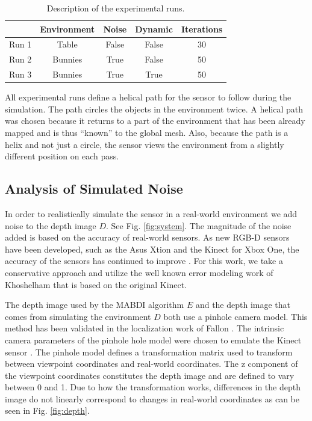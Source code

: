 \begin{table}[h]
  \caption{Description of the experimental runs.}
  \label{tab:run}
  \begin{footnotesize}
  \begin{center}
    \begin{tabular}{|l|c|c|c|c|}
    \hline
           & Environment & Noise   & Dynamic & Iterations \\\hline
    Run 1	 & Table       & False   & False   & 30 \\
    Run 2  & Bunnies     & True    & False   & 50 \\
    Run 3  & Bunnies     & True    & True    & 50 \\
    \hline
    \end{tabular}
  \end{center}
  \end{footnotesize}
\end{table}

All experimental runs define a helical path for the sensor to follow during the
simulation. The path circles the objects in the environment twice. A helical
path was chosen because it returns to a part of the environment that has been
already mapped and is thus ``known'' to the global mesh. Also, because the path
is a helix and not just a circle, the sensor views the environment from a
slightly different position on each pass.

\subsection{Analysis of Simulated Noise}

In order to realistically simulate the sensor in a real-world environment we add
noise to the depth image $D$. See Fig. \ref{fig:system}. The magnitude of the
noise added is based on the accuracy of real-world sensors. As new RGB-D sensors
have been developed, such as the Asus Xtion and the Kinect for Xbox One, the
accuracy of the sensors has continued to improve \cite{lachat2015first}. For
this work, we take a conservative approach and utilize the well known error
modeling work of Khoshelham \cite{Khoshelham2012} that is based on the original
Kinect.

The depth image used by the MABDI algorithm $E$ and the depth image that comes
from simulating the environment $D$ both use a pinhole camera model. This method
has been validated in the localization work of Fallon \cite{Fallon2012}. The
intrinsic camera parameters of the pinhole hole model were chosen to emulate the
Kinect sensor \cite{sitekinectspecs}. The pinhole model defines a transformation
matrix used to transform between viewpoint coordinates and real-world
coordinates. The z component of the viewpoint coordinates constitutes the depth
image and are defined to vary between 0 and 1. Due to how the transformation
works, differences in the depth image do not linearly correspond to changes in
real-world coordinates as can be seen in Fig. \ref{fig:depth}.

